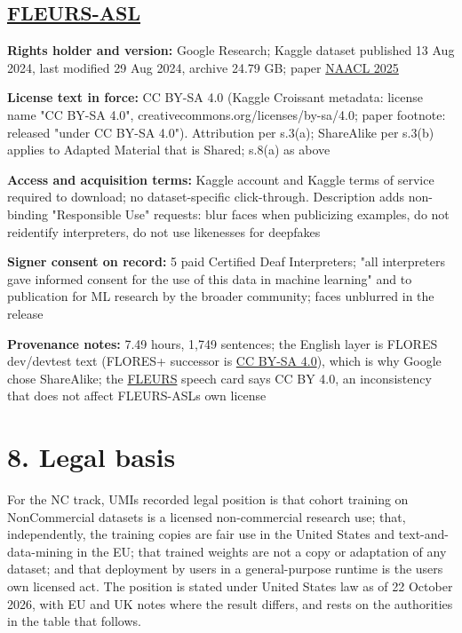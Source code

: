 \documentclass[10pt,a4paper]{article}
\begin{document}
\subsection{\texorpdfstring{\href{https://www.kaggle.com/datasets/googleai/fleurs-asl}{FLEURS-ASL}}{FLEURS-ASL}}\label{fleurs-asl}

\textbf{Rights holder and version:} Google Research; Kaggle dataset
published 13 Aug 2024, last modified 29 Aug 2024, archive 24.79 GB;
paper \href{https://aclanthology.org/2025.naacl-long.314/}{NAACL 2025}

\textbf{License text in force:} CC BY-SA 4.0 (Kaggle Croissant metadata:
license name "CC BY-SA 4.0", creativecommons.org/licenses/by-sa/4.0;
paper footnote: released "under CC BY-SA 4.0"). Attribution per s.3(a);
ShareAlike per s.3(b) applies to Adapted Material that is Shared; s.8(a)
as above

\textbf{Access and acquisition terms:} Kaggle account and Kaggle terms
of service required to download; no dataset-specific click-through.
Description adds non-binding "Responsible Use" requests: blur faces when
publicizing examples, do not reidentify interpreters, do not use
likenesses for deepfakes

\textbf{Signer consent on record:} 5 paid Certified Deaf Interpreters;
"all interpreters gave informed consent for the use of this data in
machine learning" and to publication for ML research by the broader
community; faces unblurred in the release

\textbf{Provenance notes:} 7.49 hours, 1,749 sentences; the English
layer is FLORES dev/devtest text (FLORES+ successor is
\href{https://huggingface.co/datasets/openlanguagedata/flores_plus}{CC
BY-SA 4.0}), which is why Google chose ShareAlike; the
\href{https://huggingface.co/datasets/google/fleurs}{FLEURS} speech card
says CC BY 4.0, an inconsistency that does not affect
FLEURS-ASL\textquotesingle s own license

\section{8. Legal basis}\label{8-legal-basis}

For the NC track, UMI\textquotesingle s recorded legal position is that
cohort training on NonCommercial datasets is a licensed non-commercial
research use; that, independently, the training copies are fair use in
the United States and text-and-data-mining in the EU; that trained
weights are not a copy or adaptation of any dataset; and that deployment
by users in a general-purpose runtime is the users\textquotesingle{} own
licensed act. The position is stated under United States law as of 22
October 2026, with EU and UK notes where the result differs, and rests
on the authorities in the table that follows.
\end{document}
